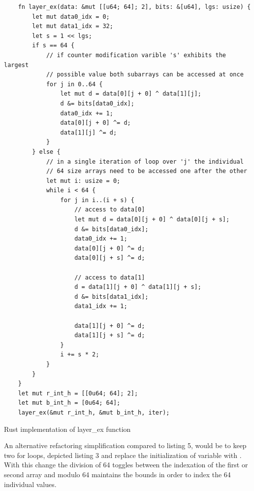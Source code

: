 \documentclass[11pt,
  oneside,openany,    %
]{scrreprt}
\begin{document}
\begin{listing}[H]
\begin{verbatim}
    fn layer_ex(data: &mut [[u64; 64]; 2], bits: &[u64], lgs: usize) {
        let mut data0_idx = 0;
        let mut data1_idx = 32;
        let s = 1 << lgs;
        if s == 64 {
            // if counter modification varible 's' exhibits the largest
            // possible value both subarrays can be accessed at once
            for j in 0..64 {
                let mut d = data[0][j + 0] ^ data[1][j];
                d &= bits[data0_idx];
                data0_idx += 1;
                data[0][j + 0] ^= d;
                data[1][j] ^= d;
            }
        } else {
            // in a single iteration of loop over 'j' the individual
            // 64 size arrays need to be accessed one after the other
            let mut i: usize = 0;
            while i < 64 {
                for j in i..(i + s) {
                    // access to data[0] 
                    let mut d = data[0][j + 0] ^ data[0][j + s];
                    d &= bits[data0_idx];
                    data0_idx += 1;
                    data[0][j + 0] ^= d;
                    data[0][j + s] ^= d;
    
                    // access to data[1]
                    d = data[1][j + 0] ^ data[1][j + s];
                    d &= bits[data1_idx];
                    data1_idx += 1;
    
                    data[1][j + 0] ^= d;
                    data[1][j + s] ^= d;
                }
                i += s * 2;
            }
        }
    }
    let mut r_int_h = [[0u64; 64]; 2];
    let mut b_int_h = [0u64; 64];
    layer_ex(&mut r_int_h, &mut b_int_h, iter);
\end{verbatim}
  \caption{Rust implementation of layer\_ex function}
  \label{list:Layer_ex_Rust}
\end{listing}

An alternative refactoring simplification compared to listing 5, would be to keep two for loops, depicted listing 3 and replace the initialization of variable  with . With this change the division of 64 toggles between the indexation of the first or second array and modulo 64 maintains the bounds in order to index the 64 individual values.
\end{document}

